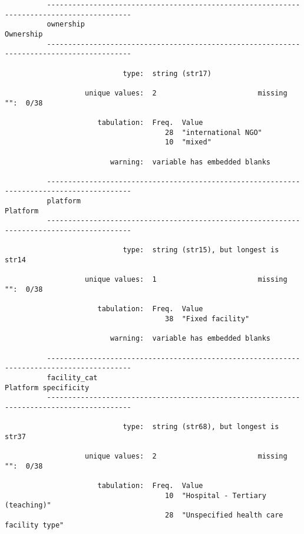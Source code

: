 \documentclass{article}
\begin{document}
\begin{verbatim}
          ------------------------------------------------------------------------------------------
          ownership                                                                        Ownership
          ------------------------------------------------------------------------------------------
          
                            type:  string (str17)
          
                   unique values:  2                        missing "":  0/38
          
                      tabulation:  Freq.  Value
                                      28  "international NGO"
                                      10  "mixed"
          
                         warning:  variable has embedded blanks
          
          ------------------------------------------------------------------------------------------
          platform                                                                          Platform
          ------------------------------------------------------------------------------------------
          
                            type:  string (str15), but longest is str14
          
                   unique values:  1                        missing "":  0/38
          
                      tabulation:  Freq.  Value
                                      38  "Fixed facility"
          
                         warning:  variable has embedded blanks
          
          ------------------------------------------------------------------------------------------
          facility_cat                                                          Platform specificity
          ------------------------------------------------------------------------------------------
          
                            type:  string (str68), but longest is str37
          
                   unique values:  2                        missing "":  0/38
          
                      tabulation:  Freq.  Value
                                      10  "Hospital - Tertiary (teaching)"
                                      28  "Unspecified health care facility type"
          

\end{verbatim}
\end{document}
